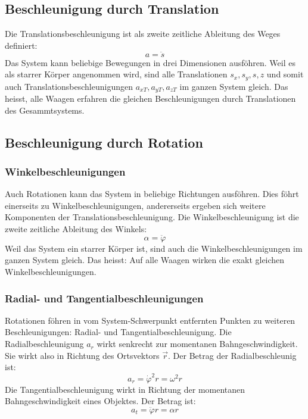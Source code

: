 \subsection{Beschleunigung durch Translation}

Die Translationsbeschleunigung ist als zweite zeitliche Ableitung des Weges definiert:
\begin{equation*}
a = \ddot{s}
\end{equation*}
Das System kann beliebige Bewegungen in drei 
Dimensionen ausföhren. Weil es als starrer Körper angenommen wird, sind alle Translationen $s_x, s_y, s,z$ und somit auch Translationsbeschleunigungen $a_{xT}, a_{yT}, a_{zT}$ im ganzen System gleich. Das heisst, alle Waagen erfahren die gleichen Beschleunigungen durch Translationen des Gesam\-mtsystems.

\subsection{Beschleunigung durch Rotation}

\subsubsection{Winkelbeschleunigungen}
Auch Rotationen kann das System in beliebige Richtungen ausföhren. Dies föhrt einerseits zu Winkelbeschleunigungen, andererseits ergeben sich weitere Komponenten der Translationsbeschleunigung. Die Winkelbeschleunigung ist die zweite zeitliche Ableitung des Winkels:
\begin{equation*}
\alpha = \ddot{\varphi}
\end{equation*}
Weil das System ein starrer Körper ist, sind auch die 
Winkelbeschleunigungen im ganzen System gleich. Das heisst: Auf alle Waagen wirken die exakt gleichen Winkelbeschleunigungen. 

\subsubsection{Radial- und Tangentialbeschleunigungen}
Rotationen föhren in vom System-Schwerpunkt entfernten 
Punkten zu weiteren Beschleunigungen: Radial- und Tangentialbeschleunigung. Die Radialbeschleunigung $a_r$ wirkt senkrecht zur momentanen Bahngeschwindigkeit. Sie wirkt also in Richtung des Ortsvektors $\vec{r}$. Der Betrag der Radialbeschleunig ist:
\begin{equation*}
a_r = \dot{\varphi}^2 r = \omega^2 r
\end{equation*}
Die Tangentialbeschleunigung  wirkt in Richtung 
der momentanen Bahngeschwindigkeit eines Objektes. Der Betrag ist:
\begin{equation*}
a_t = \ddot{\varphi} r = \alpha r
\end{equation*}
